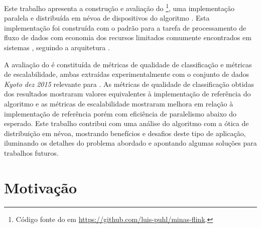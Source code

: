 
Este trabalho apresenta a construção e avaliação do \mfog\footnote{
    Código fonte do \mfog em \url{https://github.com/luis-puhl/minas-flink}.
}, uma implementação
paralela e distribuída em névoa de dispositivos \iot do algoritmo \minas.
Esta implementação foi construída com o padrão \mpi para a tarefa de
processamento de fluxo de dados com economia dos recursos limitados comumente
encontrados em sistemas \iot, seguindo a arquitetura \arch \cite{Cassales2019}.

A avaliação do \mfog é constituída de métricas de qualidade de classificação e
métricas de escalabilidade,
ambas extraídas experimentalmente com o conjunto de dados
\emph{Kyoto dez 2015} relevante para \nids.
% 
% 
As métricas de qualidade de classificação obtidas dos resultados mostraram
valores equivalentes à implementação de referência do algoritmo \minas e
as métricas de escalabilidade 
mostraram melhora em relação à implementação de
referência porém com eficiência de paralelismo abaixo do esperado.
Este trabalho contribui com uma análise do algoritmo \minas com a ótica de
distribuição em névoa, mostrando benefícios e desafios deste tipo de aplicação,
iluminando os detalhes do problema abordado e apontando algumas soluções para
trabalhos futuros.

\section{Motivação}\label{sec:motivo}


